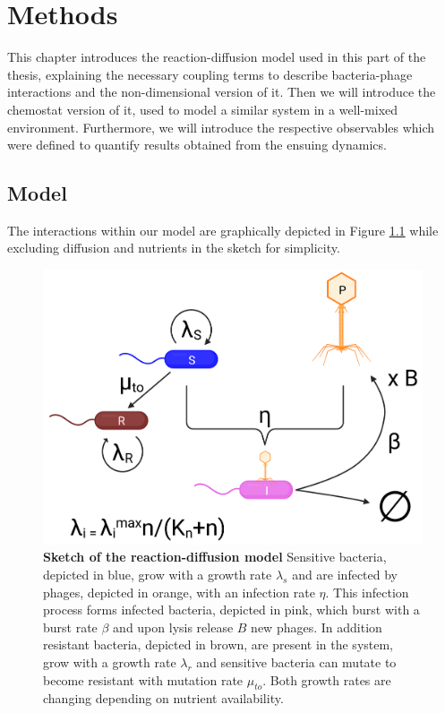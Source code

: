 \chapter{Methods}
\label{chap:phage_methods}

This chapter introduces the reaction-diffusion model used in this part of the thesis, explaining the necessary coupling terms to describe bacteria-phage interactions and the non-dimensional version of it. Then we will introduce the chemostat version of it, used to model a similar system in a well-mixed environment. Furthermore, we will introduce the respective observables which were defined to quantify results obtained from the ensuing dynamics.
\section{Model}
The interactions within our model are graphically depicted in Figure \ref{fig:model_sketch} while excluding diffusion and nutrients in the sketch for simplicity.
\begin{figure}
\centering
\includegraphics[width=\linewidth]{graphics/2025_09_30_phages_fig1.png}
\caption{\textbf{Sketch of the reaction-diffusion model} Sensitive bacteria, depicted in blue, grow with a growth rate $\lambda_s$ and are infected by phages, depicted in orange, with an infection rate $\eta$. This infection process forms infected bacteria, depicted in pink, which burst with a burst rate $\beta$ and upon lysis release $B$ new phages. In addition resistant bacteria, depicted in brown, are present in the system, grow with a growth rate $\lambda_r$ and sensitive bacteria can mutate to become resistant with mutation rate $\mu_{to}$. Both growth rates are changing depending on nutrient availability.}
\label{fig:model_sketch}
\end{figure}
